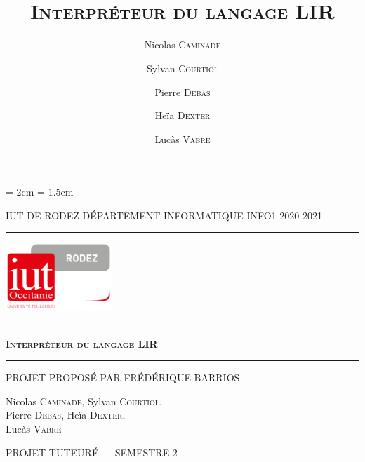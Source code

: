 \documentclass[11pt,a4paper,titlepage,openright]{report}
\title{\textsc{\textbf{ %
                       \\Interpréteur du langage LIR}
              }}
\date{}
\author{Nicolas \textsc{Caminade} \and Sylvan \textsc{Courtiol} \and Pierre
        \textsc{Debas} \and Heïa \textsc{Dexter} \and Lucàs \textsc{Vabre} }
\begin{document}
    \lhead{\leftmark}

    \cfoot{\thepage}
    \headheight = 2cm
    \headsep = 1.5cm

    \begin{titlepage}
        \selectfont

        \begin{center}\normalsize
            \MakeUppercase{IUT de Rodez \hfill Département informatique
                           \hfill INFO1 2020-2021}
        \end{center}
        \vspace*{0.1cm}
        \hrule
        \vspace*{0.2cm}
        \begin{flushright}
            \includegraphics[width=4cm]{img/logoiut}
        \end{flushright}
        \vspace*{2cm}
        \begin{flushright}\Huge
            \textsc{\textbf{ %
                    \\Interpréteur du langage LIR}}
        \end{flushright}
        \hrule
        \begin{flushleft}
            \MakeUppercase{Projet proposé par Frédérique Barrios}
        \end{flushleft}
        \vspace*{2cm}
        \begin{center}\Large
            Nicolas \textsc{Caminade}, Sylvan \textsc{Courtiol},\\
            Pierre \textsc{Debas}, Heïa \textsc{Dexter}, \\
            Lucàs \textsc{Vabre}
        \end{center}
        \vfill
        \begin{center}\normalsize
            \MakeUppercase{Projet tuteuré --- Semestre 2}
        \end{center}
    \end{titlepage}
\end{document}
